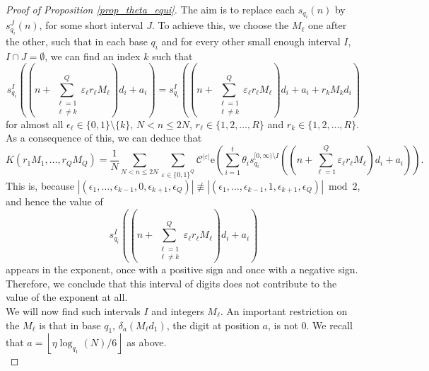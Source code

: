 \documentclass[12pt]{amsart}
\renewcommand{\leq}{\leqslant}
\theoremstyle{definition}
\numberwithin{equation}{section}
\newcommand\e{\mathrm{e}}
\numberwithin{equation}{section}
\begin{document}
\begin{proof}[Proof of Proposition \ref{prop_theta_equi}]
	The aim is to replace each $s_{q_i}(n)$ by $s_{q_i}^{J}(n)$, for some short interval $J$. To achieve this, we choose the $M_{\ell}$ one after the other, such that in each base $q_i$ and for every other small enough interval $I$, $I\cap J =\emptyset$, we can find an index $k$ such that
	\[
		s_{q_i}^{I}\left(\left(n+\sum_{\substack{\ell = 1\\\ell \neq k}}^{Q}\varepsilon_{\ell}r_{\ell}M_{\ell}\right)d_i+a_i\right) = s_{q_i}^{I}\left(\left(n+\sum_{\substack{\ell = 1\\\ell \neq k}}^{Q}\varepsilon_{\ell}r_{\ell}M_{\ell}\right)d_i+a_i+r_{k}M_{k}d_i\right)
	\]
	for almost all $\epsilon_{\ell} \in \{0,1\}\setminus\{k\}$, $N<n\leq 2N $, $r_{\ell}\in\{1,2,\dots, R\}$ and $r_k\in\{1,2,\dots, R\}$. As a consequence of this, we can deduce that
	\begin{equation}\label{eq_observation}
		K(r_1M_1,\dots, r_QM_Q) = \frac 1N \sum_{N<n\leq 2N} \sum_{\varepsilon\in \{0,1\}^Q}\mathcal{C}^{|\varepsilon|}
		\e\left(\sum_{i=1}^{t}\theta_i s_{q_i}^{[0,\infty)\setminus I}\left(\left(n+\sum_{\ell = 1}^{Q}\varepsilon_{\ell}r_{\ell}M_{\ell}\right)d_i+a_i\right)\right).
	\end{equation}
	This is, because $|(\epsilon_1,\dots, \epsilon_{k-1},0,\epsilon_{k+1}, \epsilon_Q)|\not\equiv|(\epsilon_1,\dots, \epsilon_{k-1},1,\epsilon_{k+1}, \epsilon_Q)|\bmod2$, and hence the value of
	\[
		s_{q_i}^{I}\left(\left(n+\sum_{\substack{\ell = 1\\\ell \neq k}}^{Q}\varepsilon_{\ell}r_{\ell}M_{\ell}\right)d_i+a_i\right)
	\]
	appears in the exponent, once with a positive sign and once with a negative sign. Therefore, we conclude that this interval of digits does not contribute to the value of the exponent at all.\\
	
	We will now find such intervals $I$ and integers $M_{\ell}$. An important restriction on the $M_{\ell}$ is that in base $q_1$, $\delta_a\left(M_{\ell}d_1\right)$, the digit at position $a$, is not $0$. We recall that $a=\left\lfloor \eta\log_{q_1}(N)/6 \right\rfloor$ as above.\\
	

\end{proof}
\end{document}
